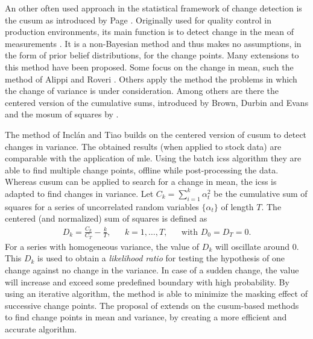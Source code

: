 
An other often used approach in the statistical framework of change detection is the \gls{cusum} as introduced by Page \cite{page1954continuous}.
Originally used for quality control in production environments, its main function is to detect change in the mean of measurements \cite{basseville1993detection}.
It is a non-Bayesian method and thus makes no assumptions, in the form of prior belief distributions, for the change points.
Many extensions to this method have been proposed.
Some focus on the change in mean, such the method of Alippi and Roveri \cite{alippi2006adaptive}.
Others apply the method the problems in which the change of variance is under consideration.
Among others are there the centered version of the cumulative sums, introduced by Brown, Durbin and Evans \cite{brown1975techniques} and the \gls{mosum} of squares by \cite{hsu2007mosum}.

The method of Incl\'{a}n and Tiao \cite{inclan1994use} builds on the centered version of \gls{cusum} \cite{brown1975techniques} to detect changes in variance.
The obtained results (when applied to stock data) are comparable with the application of \gls{mle}.
Using the batch \gls{icss} algorithm they are able to find multiple change points, offline while post-processing the data.
Whereas \gls{cusum} can be applied to search for a change in mean, the \gls{icss} is adapted to find changes in variance.
Let $C_k = \sum_{i=1}^k \alpha_t^2$ be the cumulative sum of squares for a series of uncorrelated random variables $\{\alpha_t\}$ of length $T$.
The centered (and normalized) sum of squares is defined as
\begin{equation}
  \begin{aligned}
  D_k = \frac{C_k}{C_T} - \frac{k}{T}, & & k = 1, \dots, T, & & \text{with } D_0 = D_T = 0.
  \end{aligned}
\end{equation}
For a series with homogeneous variance, the value of $D_k$ will oscillate around $0$.
This $D_k$ is used to obtain a \emph{likelihood ratio} for testing the hypothesis of one change against no change in the variance.
In case of a sudden change, the value will increase and exceed some predefined boundary with high probability.
By using an iterative algorithm, the method is able to minimize the masking effect of successive change points.
The proposal of \cite{cheng2009efficient} extends on the \gls{cusum}-based methods to find change points in mean and variance, by creating a more efficient and accurate algorithm.


